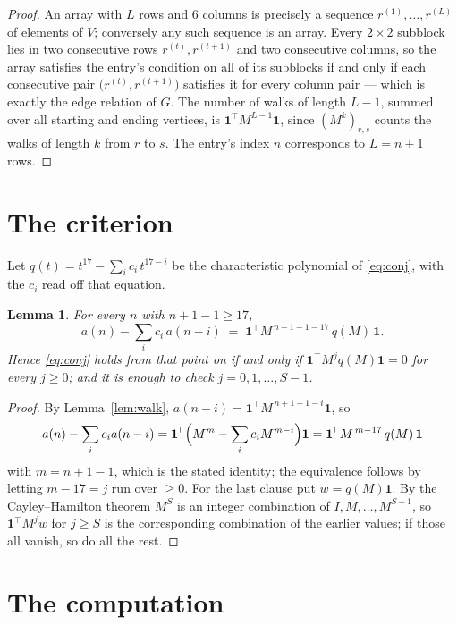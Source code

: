 \documentclass[11pt,a4paper]{article}
\theoremstyle{plain}
\newtheorem{lemma}[theorem]{Lemma}
\theoremstyle{definition}
\begin{document}
\begin{proof}
An array with $L$ rows and $6$ columns is precisely a sequence
$r^{(1)},\dots,r^{(L)}$ of elements of $V$; conversely any such sequence is an array.
Every $2\times2$ subblock lies in two consecutive rows $r^{(t)},r^{(t+1)}$ and two
consecutive columns, so the array satisfies the entry's condition on all of its subblocks
if and only if each consecutive pair $\bigl(r^{(t)},r^{(t+1)}\bigr)$ satisfies it for
every column pair --- which is exactly the edge relation of $G$. The number of walks of
length $L-1$, summed over all starting and ending vertices, is
$\mathbf{1}^{\!\top}M^{L-1}\mathbf{1}$, since $(M^{k})_{r,s}$ counts the walks of
length $k$ from $r$ to $s$. The entry's index $n$ corresponds to $L=n+1$ rows.
\end{proof}

\section{The criterion}

Let $q(t)=t^{17}-\sum_i c_i\,t^{17-i}$ be the characteristic polynomial of
\eqref{eq:conj}, with the $c_i$ read off that equation.

\begin{lemma}\label{lem:crit}
For every $n$ with $n+1-1\ge17$,
\[
a(n)-\sum_i c_i\,a(n-i)\;=\;\mathbf{1}^{\!\top}M^{\,n+1-1-17}\,q(M)\,\mathbf{1} .
\]
Hence \eqref{eq:conj} holds from that point on if and only if
$\mathbf{1}^{\!\top}M^{j}q(M)\mathbf{1}=0$ for every $j\ge0$; and it is enough to check
$j=0,1,\dots,S-1$.
\end{lemma}

\begin{proof}
By Lemma~\ref{lem:walk}, $a(n-i)=\mathbf{1}^{\!\top}M^{\,n+1-1-i}\mathbf{1}$, so
\[
a(n)-\sum_i c_i a(n-i)
=\mathbf{1}^{\!\top}\Bigl(M^{m}-\sum_i c_i M^{m-i}\Bigr)\mathbf{1}
=\mathbf{1}^{\!\top}M^{\,m-17}\,q(M)\,\mathbf{1}
\]
with $m=n+1-1$, which is the stated identity; the equivalence follows by letting
$m-17=j$ run over $\ge0$. For the last clause put $w=q(M)\mathbf{1}$. By the
Cayley--Hamilton theorem $M^{S}$ is an integer combination of $I,M,\dots,M^{S-1}$, so
$\mathbf{1}^{\!\top}M^{j}w$ for $j\ge S$ is the corresponding combination of the earlier
values; if those all vanish, so do all the rest.
\end{proof}

\section{The computation}
\end{document}
